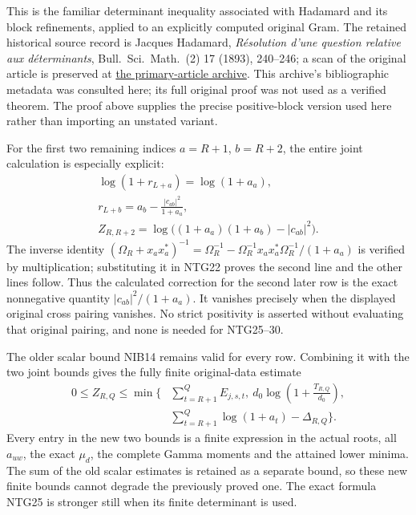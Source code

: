 \documentclass[11pt,a4paper]{article}
\begin{document}
This is the familiar determinant inequality associated with
Hadamard and its block refinements, applied to an explicitly
computed original Gram. The retained historical source record is
Jacques Hadamard, \emph{R\'esolution d'une question relative
aux d\'eterminants}, Bull.\ Sci.\ Math.\ (2) 17 (1893),
240--246; a scan of the original article is preserved at
\href{https://zenodo.org/records/18674602}{the primary-article archive}.
This archive's bibliographic metadata was consulted here;
its full original proof was not used as a verified theorem.
The proof above supplies the precise positive-block version
used here rather than importing an unstated variant.

For the first two remaining indices $a=R+1$, $b=R+2$,
the entire joint calculation is especially explicit:
\[
\begin{gathered}
 \log(1+r_{L+a})=\log(1+a_a),\\
 r_{L+b}=a_b-\frac{|c_{ab}|^2}{1+a_a},\\
 Z_{R,R+2}=\log\bigl((1+a_a)(1+a_b)-|c_{ab}|^2\bigr).
\end{gathered}                                                    \tag{NTG30}
\]
The inverse identity
$(\Omega_R+x_ax_a^*)^{-1}
=\Omega_R^{-1}
-\Omega_R^{-1}x_ax_a^*\Omega_R^{-1}/(1+a_a)$
is verified by multiplication; substituting it in
NTG22 proves the second line and the other lines follow.
Thus the calculated correction for the second later row
is the exact nonnegative quantity $|c_{ab}|^2/(1+a_a)$.
It vanishes precisely when the displayed original
cross pairing vanishes. No strict positivity is asserted
without evaluating that original pairing, and none is
needed for NTG25--30.

The older scalar bound NIB14 remains valid for every row.
Combining it with the two joint bounds gives the
fully finite original-data estimate
\[
\begin{split}
 0\le Z_{R,Q}\le \min\bigg\{&
 \sum_{t=R+1}^{Q}E_{j,s,t},\
 d_0\log\left(1+\frac{T_{R,Q}}{d_0}\right),\\
 &\sum_{t=R+1}^{Q}\log(1+a_t)-\Delta_{R,Q}\bigg\}.
\end{split}                                                      \tag{NTG31}
\]
Every entry in the new two bounds is a finite expression
in the actual roots, all $a_{uw}$, the exact $\mu_d$,
the complete Gamma moments and the attained lower minima.
The sum of the old scalar estimates is retained as a
separate bound, so these new finite bounds cannot degrade
the previously proved one. The exact formula NTG25
is stronger still when its finite determinant is used.
\end{document}
